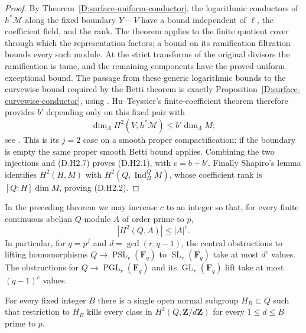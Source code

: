 \begin{proof}
By Theorem~\ref{D:surface-uniform-conductor}, the
logarithmic conductors of $h^*\mathcal M$ along the
fixed boundary $Y-V$ have a bound independent of
$\ell$, the coefficient field, and the rank.
The theorem applies to the finite quotient cover
through which the representation factors; a bound
on its ramification filtration bounds every such
module.  At the strict transforms of the original
divisors the ramification is tame, and the remaining
components have the proved uniform exceptional bound.
The passage from these generic logarithmic bounds to the
curvewise bound required by the Betti theorem is exactly
Proposition~\ref{D:surface-curvewise-conductor}, using
\citep[Proposition~5.8(3)]{C_HuTeyssierRam2025}.
Hu--Teyssier's finite-coefficient theorem therefore
provides $b'$ depending only on this fixed pair with
\[
                   \dim_\Lambda H^2(V,h^*\mathcal M)
                            \le b'\dim_\Lambda M;
\]
see \citep[Theorem~7.34 and its proof, p.~41]
{C_HuTeyssierBetti2025}.  This is its $j=2$ case on
a smooth proper compactification; if the boundary
is empty the same proper smooth Betti bound applies.
Combining the two injections and (D.H2.7) proves
(D.H2.1), with $c=b+b'$.  Finally Shapiro's lemma
identifies $H^2(H,M)$ with
$H^2(Q,\operatorname{Ind}_H^Q M)$, whose coefficient
rank is $[Q:H]\dim M$, proving (D.H2.2).
\end{proof}

\begin{corollary}
\label{D:surface-tame-central-obstructions}
In the preceding theorem we may increase $c$ to an integer so
that, for every finite continuous abelian $Q$-module $A$ of
order prime to $p$,
\[
                         |H^2(Q,A)|\le |A|^c.            \tag{D.H2.8}
\]
In particular, for $q=p^f$ and $d=\gcd(r,q-1)$, the central
obstructions to lifting homomorphisms
$Q\to\operatorname{PSL}_r(\mathbf F_q)$ to
$\operatorname{SL}_r(\mathbf F_q)$ take at most $d^c$
values.  The obstructions for
$Q\to\operatorname{PGL}_r(\mathbf F_q)$ and its
$\operatorname{GL}_r(\mathbf F_q)$ lift take at most
$(q-1)^c$ values.

For every fixed integer $B$ there is a single open normal
subgroup $H_B\subset Q$ such that restriction to $H_B$
kills every class in $H^2(Q,\mathbf Z/d\mathbf Z)$
for every $1\le d\le B$ prime to $p$.
\end{corollary}

